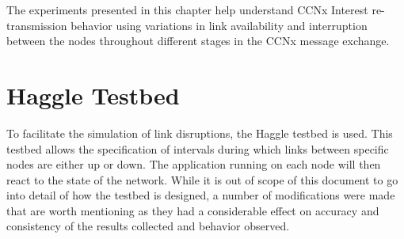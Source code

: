\documentclass[a4paper,12pt]{report}      %
\begin{document}
The experiments presented in this chapter help understand CCNx Interest re-transmission behavior using variations in link availability and interruption between the nodes throughout different stages in the CCNx message exchange.

\section{Haggle Testbed}

To facilitate the simulation of link disruptions, the Haggle testbed\cite{haggle} is used. 
This testbed allows the specification of intervals during which links between specific nodes are either up or down. The application running on each node will then react to the state of the network. While it is out of scope of this document to go into detail of how
the testbed is designed, a number of modifications were made that are worth mentioning as they had a considerable effect on accuracy and consistency of the results collected and behavior observed.
\end{document}
